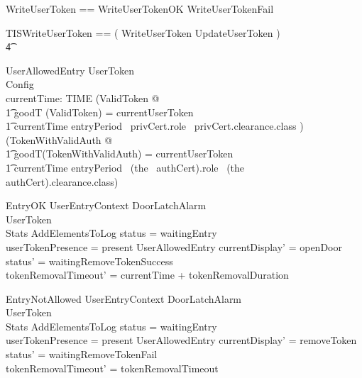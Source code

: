 \begin{zed}
WriteUserToken == WriteUserTokenOK \lor WriteUserTokenFail
\end{zed}

\begin{zed}
        TISWriteUserToken == (
        WriteUserToken \semi UpdateUserToken )
\\ \t4          \lor [~ UserTokenTorn | status = waitingUpdateToken ~] 
\end{zed}

\begin{schema}{UserAllowedEntry}
        UserToken
\\      Config
\\      currentTime: TIME
\where
        (\exists ValidToken @ 
\\ \t1  goodT (\theta ValidToken) = currentUserToken
\\ \t1  \land currentTime \in entryPeriod~ privCert.role~
privCert.clearance.class )
\\ \lor
        (\exists TokenWithValidAuth @ 
\\ \t1 goodT(\theta TokenWithValidAuth) = currentUserToken 
\\ \t1 \land currentTime \in entryPeriod~
        (the~ authCert).role~ (the~ authCert).clearance.class)
\end{schema}

\begin{schema}{EntryOK}
        UserEntryContext
\also
        \Xi DoorLatchAlarm
\\      \Xi UserToken
\\      \Xi Stats
\also
        AddElementsToLog
\where
        status = waitingEntry
\\      userTokenPresence = present
\also
        UserAllowedEntry
\also
        currentDisplay' = openDoor
\\      status' = waitingRemoveTokenSuccess
\\      tokenRemovalTimeout' = currentTime + tokenRemovalDuration
\end{schema}

\begin{schema}{EntryNotAllowed}
        UserEntryContext
\also
        \Xi DoorLatchAlarm
\\      \Xi UserToken
\\      \Xi Stats       
\also
        AddElementsToLog
\where
        status = waitingEntry
\\      userTokenPresence = present
\also
        \lnot UserAllowedEntry
\also
        currentDisplay' = removeToken
\\      status' = waitingRemoveTokenFail
\\      tokenRemovalTimeout' = tokenRemovalTimeout
\end{schema}

